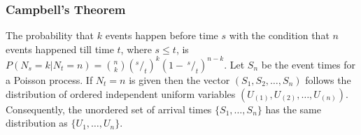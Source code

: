 \subsubsection*{Campbell's Theorem}
 The probability that $k$ events happen before time $s$ with the condition that $n$ events happened till time $t$, where $s \le t$, is 
$P(N_s = k| N_t = n) = \binom{n}{k} (^s/_t)^k(1-\, ^s/_t)^{n-k}$.
 Let $S_n$ be the event times for a Poisson process. If $N_t = n$ is given then the vector $(S_1, S_2, \ldots, S_n)$ follows the distribution of ordered independent uniform variables $(U_{(1)}, U_{(2)}, \ldots, U_{(n)})$. Consequently, the unordered set of arrival times $\{S_1, \ldots, S_n\}$ has the same distribution as $\{U_1, \ldots, U_n\}$.